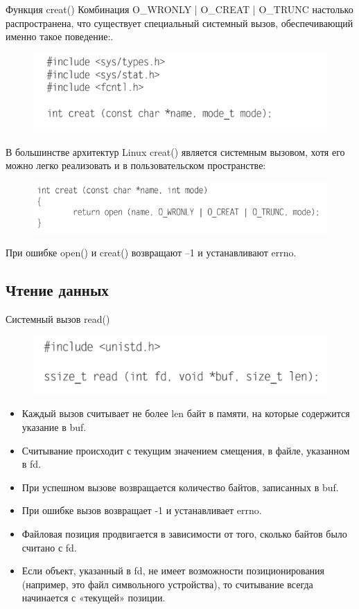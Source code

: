 \documentclass{beamer}
\begin{document}
\begin{frame}{Функция creat()}
Комбинация O\_WRONLY | O\_CREAT | O\_TRUNC настолько распространена, что существует
специальный системный вызов, обеспечивающий именно такое поведение:. 
\begin{figure}[h]
\centering
\includegraphics[scale=0.6]{images/lec06-pic05.png}
\end{figure}
В большинстве архитектур Linux creat() является системным вызовом, хотя
его можно легко реализовать и в пользовательском пространстве:
\begin{figure}[h]
\centering
\includegraphics[scale=0.6]{images/lec06-pic06.png}
\end{figure}
При ошибке open() и creat() возвращают –1 и устанавливают errno.
\end{frame}

\subsection{Чтение данных}

\begin{frame}{Системный вызов read()}
\begin{figure}[h]
\centering
\includegraphics[scale=0.6]{images/lec06-pic07.png}
\end{figure}
\begin{itemize}
\item Каждый вызов считывает не более len байт в памяти, на которые содержится
указание в buf. 
\item Считывание происходит с текущим значением смещения, в файле,
указанном в fd. 
\item При успешном вызове возвращается количество байтов, записанных
в buf. 
\item При ошибке вызов возвращает -1 и устанавливает errno. 
\item Файловая позиция продвигается в зависимости от того, сколько байтов было считано с fd. 
\item Если объект, указанный в fd, не имеет возможности позиционирования (например, это файл символьного устройства), то считывание всегда начинается с «текущей» позиции.
\end{itemize}
\end{frame}
\end{document}
